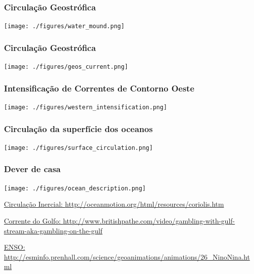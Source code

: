 \begin{frame}
  \frametitle{Circulação Geostrófica}
  \begin{center}
    \texttt{[image: ./figures/water\_mound.png]}
  \end{center}
\end{frame}


\begin{frame}
  \frametitle{Circulação Geostrófica}
  \begin{center}
    \texttt{[image: ./figures/geos\_current.png]}
  \end{center}
\end{frame}


\begin{frame}
  \frametitle{Intensificação de Correntes de Contorno Oeste}
  \begin{center}
    \texttt{[image: ./figures/western\_intensification.png]}
  \end{center}
\end{frame}


\begin{frame}
  \frametitle{Circulação da superfície dos oceanos}
  \begin{center}
    \texttt{[image: ./figures/surface\_circulation.png]}
  \end{center}
\end{frame}


\begin{frame}
  \frametitle{Dever de casa}
  \begin{center}
    \texttt{[image: ./figures/ocean\_description.png]}
  \end{center}

\scriptsize{

\href{http://oceanmotion.org/html/resources/coriolis.htm}{Circulação Inercial: \url{http://oceanmotion.org/html/resources/coriolis.htm}}

\href{http://www.britishpathe.com/video/gambling-with-gulf-stream-aka-gambling-on-the-gulf}{Corrente do Golfo: \url{http://www.britishpathe.com/video/gambling-with-gulf-stream-aka-gambling-on-the-gulf}}

\href{http://esminfo.prenhall.com/science/geoanimations/animations/26_NinoNina.html}{ENSO: \url{http://esminfo.prenhall.com/science/geoanimations/animations/26_NinoNina.html}}

}
\end{frame}


